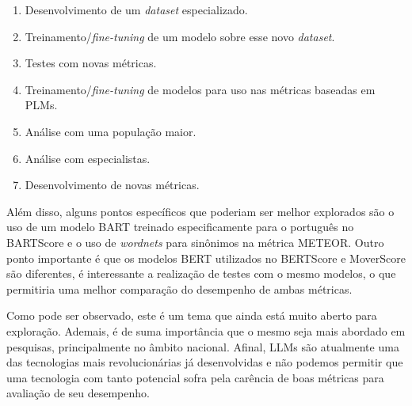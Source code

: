 \documentclass[cic,tc]{iiufrgs}
\begin{document}
\begin{enumerate}
    \item Desenvolvimento de um \textit{dataset} especializado.
    \item Treinamento/\textit{fine-tuning} de um modelo sobre esse novo \textit{dataset}.
    \item Testes com novas métricas.
    \item Treinamento/\textit{fine-tuning} de modelos para uso nas métricas baseadas em PLMs.
    \item Análise com uma população maior.
    \item Análise com especialistas.
    \item Desenvolvimento de novas métricas.
\end{enumerate}

Além disso, alguns pontos específicos que poderiam ser melhor explorados são o uso de um modelo BART treinado especificamente para o português no BARTScore e o uso de \textit{wordnets} para sinônimos na métrica METEOR. Outro ponto importante é que os modelos BERT utilizados no BERTScore e MoverScore são diferentes, é interessante a realização de testes com o mesmo modelos, o que permitiria uma melhor comparação do desempenho de ambas métricas.

Como pode ser observado, este é um tema que ainda está muito aberto para exploração. Ademais, é de suma importância que o mesmo seja mais abordado em pesquisas, principalmente no âmbito nacional. Afinal, LLMs são atualmente uma das tecnologias mais revolucionárias já desenvolvidas e não podemos permitir que uma tecnologia com tanto potencial sofra pela carência de boas métricas para avaliação de seu desempenho.



\end{document}
